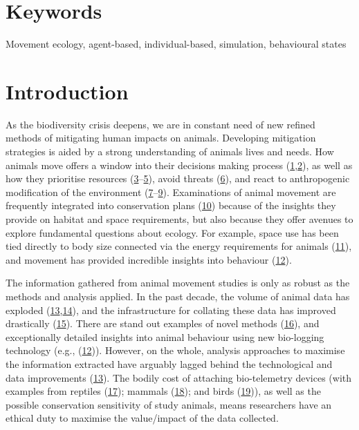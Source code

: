 \documentclass[10pt,a4paper]{article}
\begin{document}
\section*{\color{f1ROrange}Keywords}

Movement ecology, agent-based, individual-based, simulation, behavioural states

\clearpage
\pagestyle{fancy}

\hypertarget{main}{%
\section{Introduction}\label{main}}

As the biodiversity crisis deepens, we are in constant need of new refined methods of mitigating human impacts on animals.
Developing mitigation strategies is aided by a strong understanding of animals lives and needs.
How animals move offers a window into their decisions making process (\protect\hyperlink{ref-Bastille-Rousseau2017}{1},\protect\hyperlink{ref-sridhar_geometry_2021}{2}), as well as how they prioritise resources (\protect\hyperlink{ref-prange_influences_2004}{3}--\protect\hyperlink{ref-vogt_suitability_2018}{5}), avoid threats (\protect\hyperlink{ref-loveridge_landscape_2017}{6}), and react to anthropogenic modification of the environment (\protect\hyperlink{ref-Tucker2018}{7}--\protect\hyperlink{ref-arrondo_invisible_2018}{9}).
Examinations of animal movement are frequently integrated into conservation plans (\protect\hyperlink{ref-Fraser2018}{10}) because of the insights they provide on habitat and space requirements, but also because they offer avenues to explore fundamental questions about ecology.
For example, space use has been tied directly to body size connected via the energy requirements for animals (\protect\hyperlink{ref-noonan_effects_2020}{11}), and movement has provided incredible insights into behaviour (\protect\hyperlink{ref-studd_purrfect_2021}{12}).

The information gathered from animal movement studies is only as robust as the methods and analysis applied.
In the past decade, the volume of animal data has exploded (\protect\hyperlink{ref-joo_recent_2022}{13},\protect\hyperlink{ref-wild_internet_2022}{14}), and the infrastructure for collating these data has improved drastically (\protect\hyperlink{ref-kays_movebank_2022}{15}).
There are stand out examples of novel methods (\protect\hyperlink{ref-saunders_radio-tracking_2022}{16}), and exceptionally detailed insights into animal behaviour using new bio-logging technology (e.g., (\protect\hyperlink{ref-studd_purrfect_2021}{12})).
However, on the whole, analysis approaches to maximise the information extracted have arguably lagged behind the technological and data improvements (\protect\hyperlink{ref-joo_recent_2022}{13}).
The bodily cost of attaching bio-telemetry devices (with examples from reptiles (\protect\hyperlink{ref-Weatherhead2004}{17}); mammals (\protect\hyperlink{ref-robstad_impact_2021}{18}); and birds (\protect\hyperlink{ref-portugal_externally_2022}{19})), as well as the possible conservation sensitivity of study animals, means researchers have an ethical duty to maximise the value/impact of the data collected.
\end{document}
